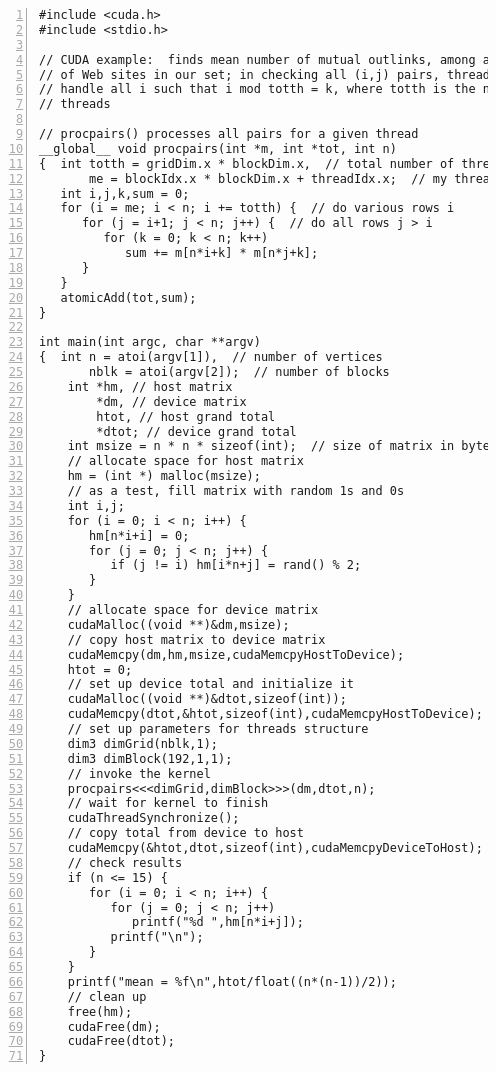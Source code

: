 \begin{lstlisting}[numbers=left]
#include <cuda.h>
#include <stdio.h>

// CUDA example:  finds mean number of mutual outlinks, among all pairs
// of Web sites in our set; in checking all (i,j) pairs, thread k will
// handle all i such that i mod totth = k, where totth is the number of
// threads

// procpairs() processes all pairs for a given thread
__global__ void procpairs(int *m, int *tot, int n)
{  int totth = gridDim.x * blockDim.x,  // total number of threads
       me = blockIdx.x * blockDim.x + threadIdx.x;  // my thread number
   int i,j,k,sum = 0; 
   for (i = me; i < n; i += totth) {  // do various rows i
      for (j = i+1; j < n; j++) {  // do all rows j > i
         for (k = 0; k < n; k++)
            sum += m[n*i+k] * m[n*j+k];
      }
   }
   atomicAdd(tot,sum);
}

int main(int argc, char **argv)
{  int n = atoi(argv[1]),  // number of vertices
       nblk = atoi(argv[2]);  // number of blocks
    int *hm, // host matrix
        *dm, // device matrix
        htot, // host grand total
        *dtot; // device grand total
    int msize = n * n * sizeof(int);  // size of matrix in bytes
    // allocate space for host matrix
    hm = (int *) malloc(msize);  
    // as a test, fill matrix with random 1s and 0s
    int i,j;
    for (i = 0; i < n; i++) {
       hm[n*i+i] = 0;
       for (j = 0; j < n; j++) {
          if (j != i) hm[i*n+j] = rand() % 2;
       }
    }
    // allocate space for device matrix 
    cudaMalloc((void **)&dm,msize);
    // copy host matrix to device matrix
    cudaMemcpy(dm,hm,msize,cudaMemcpyHostToDevice);
    htot = 0;
    // set up device total and initialize it
    cudaMalloc((void **)&dtot,sizeof(int));
    cudaMemcpy(dtot,&htot,sizeof(int),cudaMemcpyHostToDevice);
    // set up parameters for threads structure
    dim3 dimGrid(nblk,1);
    dim3 dimBlock(192,1,1);
    // invoke the kernel
    procpairs<<<dimGrid,dimBlock>>>(dm,dtot,n);
    // wait for kernel to finish
    cudaThreadSynchronize();
    // copy total from device to host
    cudaMemcpy(&htot,dtot,sizeof(int),cudaMemcpyDeviceToHost);
    // check results
    if (n <= 15) {
       for (i = 0; i < n; i++) {
          for (j = 0; j < n; j++) 
             printf("%d ",hm[n*i+j]);
          printf("\n");
       }
    }
    printf("mean = %f\n",htot/float((n*(n-1))/2));
    // clean up
    free(hm);
    cudaFree(dm);
    cudaFree(dtot);
}
\end{lstlisting}

